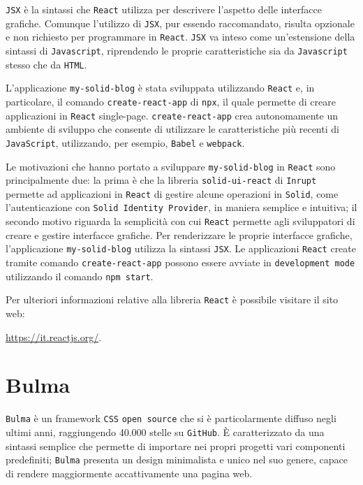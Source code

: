 \medskip

{\tt JSX} è la sintassi che {\tt React} utilizza per descrivere l'aspetto delle interfacce grafiche. Comunque l'utilizzo di {\tt JSX}, pur essendo raccomandato, risulta opzionale e non richiesto per programmare in {\tt React}. {\tt JSX} va inteso come un'estensione della sintassi di {\tt Javascript}, riprendendo le proprie caratteristiche sia da {\tt Javascript} stesso che da {\tt HTML}.

\bigskip

L'applicazione {\tt my-solid-blog} è stata sviluppata utilizzando {\tt React} e, in particolare, il comando {\tt create-react-app} di {\tt npx}, il quale permette di creare applicazioni in {\tt React} single-page. {\tt create-react-app} crea autonomamente un ambiente di sviluppo che consente di utilizzare le caratteristiche più recenti di {\tt JavaScript}, utilizzando, per esempio, {\tt Babel} e {\tt webpack}.

\bigskip

Le motivazioni che hanno portato a sviluppare {\tt my-solid-blog} in {\tt React} sono principalmente due: la prima è che la libreria {\tt solid-ui-react} di {\tt Inrupt} permette ad applicazioni in {\tt React} di gestire alcune operazioni in {\tt Solid}, come l'autenticazione con {\tt Solid Identity Provider}, in maniera semplice e intuitiva; il secondo motivo riguarda la semplicità con cui {\tt React} permette agli sviluppatori di creare e gestire interfacce grafiche. Per renderizzare le proprie interfacce grafiche, l'applicazione {\tt my-solid-blog} utilizza la sintassi {\tt JSX}. Le applicazioni {\tt React} create tramite comando {\tt create-react-app} possono essere avviate in {\tt development mode} utilizzando il comando {\tt npm start}.

\bigskip

Per ulteriori informazioni relative alla libreria {\tt React} è possibile visitare il sito web:

\smallskip

\href{https://it.reactjs.org/}{https://it.reactjs.org/}.

\bigskip

\section{Bulma}

\medskip

{\tt Bulma} è un framework {\tt CSS} {\tt open source} che si è particolarmente diffuso negli ultimi anni, raggiungendo 40.000 stelle su {\tt GitHub}. È caratterizzato da una sintassi semplice che permette di importare nei propri progetti vari componenti predefiniti; {\tt Bulma} presenta un design minimalista e unico nel suo genere, capace di rendere maggiormente accattivamente una pagina web.

